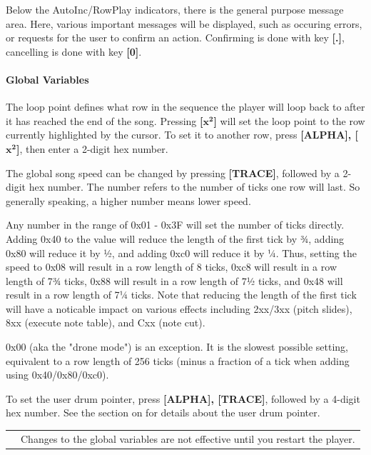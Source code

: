 \documentclass[12pt]{report}	%
\newcommand*{\TakeFourierOrnament}[1]{{%
\fontencoding{U}\fontfamily{futs}\selectfont\char#1}}
\newcommand*{\danger}{\TakeFourierOrnament{66}}
\begin{document}
Below the AutoInc/RowPlay indicators, there is the general purpose message area. Here, various important messages will be displayed, such as occuring errors, or requests for the user to confirm an action. Confirming is done with key \textbf{[.]}, cancelling is done with key \textbf{[0]}. 

\paragraph{Global Variables}\label{sec:globalvars} The loop point defines what row in the sequence the player will loop back to after it has reached the end of the song. Pressing \textbf{[$\bm{x^2}$]} will set the loop point to the row currently highlighted by the cursor. To set it to another row, press \textbf{[ALPHA], [$\bm{x^2}$]}, then enter a 2-digit hex number.

The global song speed can be changed by pressing \textbf{[TRACE]}, followed by a 2-digit hex number. The number refers to the number of ticks one row will last. So generally speaking, a higher number means lower speed.

Any number in the range of 0x01 - 0x3F will set the number of ticks directly. Adding 0x40 to the value will reduce the length of the first tick by ¾, adding 0x80 will reduce it by ½, and adding 0xc0 will reduce it by ¼. Thus, setting the speed to 0x08 will result in a row length of 8 ticks, 0xc8 will result in a row length of 7¾ ticks, 0x88 will result in a row length of 7½ ticks, and 0x48 will result in a row length of 7¼ ticks. Note that reducing the length of the first tick will have a noticable impact on various effects including 2xx/3xx (pitch slides), 8xx (execute note table), and Cxx (note cut).

0x00 (aka the "drone mode") is an exception. It is the slowest possible setting, equivalent to a row length of 256 ticks (minus a fraction of a tick when adding using 0x40/0x80/0xc0).

To set the user drum pointer, press \textbf{[ALPHA], [TRACE]}, followed by a 4-digit hex number. See the section on  for details about the user drum pointer. \newline

\begin{tabularx}{\textwidth}{m{} X}
{\textcolor{red}{\newline\Huge\danger}} & Changes to the global variables are not effective until you restart the player. \\
\end{tabularx} ~\\
\end{document}
